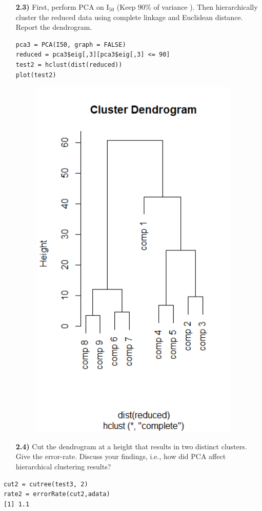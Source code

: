 \documentclass{article}
\begin{document}
\begin{enumerate}
  \item[\textbf{2.3)}] First, perform PCA on $\text{I}_{50}$ (Keep $90\%$ of variance ). Then hierarchically cluster the reduced data using complete linkage and Euclidean distance. Report the dendrogram.
\\  
\begin{lstlisting}
pca3 = PCA(I50, graph = FALSE)
reduced = pca3$eig[,3][pca3$eig[,3] <= 90]
test2 = hclust(dist(reduced))
plot(test2)
\end{lstlisting}
\begin{figure}
  \includegraphics[width=100mm, scale = 0.5]{h2.png}
\end{figure}
    \item[\textbf{2.4)}]  Cut the dendrogram at a height that results in two distinct  clusters. Give the error-rate.  Discuss your findings, i.e., how  did PCA affect hierarchical clustering results?
\end{enumerate}
\begin{lstlisting}
cut2 = cutree(test3, 2)
rate2 = errorRate(cut2,adata)
[1] 1.1
\end{lstlisting}
\end{document}
